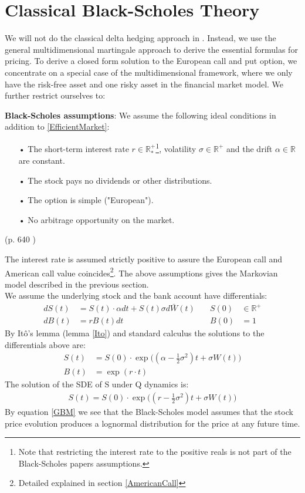 \section{Classical Black-Scholes Theory}\label{classicBS}
We will not do the classical delta hedging approach in \parencite{B-S-Paper}. Instead, we use the general multidimensional martingale approach to derive the essential formulas for pricing. 
To derive a closed form solution to the European call and put option, we concentrate on a special case of the multidimensional framework, where we only have the risk-free asset and one risky asset in the financial market model. 
We further restrict ourselves to:
\theoremstyle{assumption}
\begin{assumption}{\textbf{Black-Scholes assumptions}:}\label{BS-Assumption}
We assume the following ideal conditions in addition to \eqref{EfficientMarket}:
\begin{enumerate}
\item[•] The short-term interest rate $r\in \mathbb{R}^+_*$\footnote{Note that restricting the interest rate to the positive reals is not part of the Black-Scholes papers assumptions.}, volatility $\sigma \in \mathbb{R}^+$ and the drift $\alpha\in \mathbb{R}$ are constant.
\item[•] The stock pays no dividends or other distributions.
\item[•] The option is simple ("European").
\item[•] No arbitrage opportunity on the market.
\end{enumerate}
\null \hfill (p. 640 \parencite{B-S-Paper})
\end{assumption}
The interest rate is assumed strictly positive to assure the European call and American call value coincides\footnote{Detailed explained in section \ref{AmericanCall}}. The above assumptions gives the Markovian model described in the previous section. \\

We assume the underlying stock and the bank account have differentials:
\begin{align*}
dS(t)&=S(t)\cdot \alpha dt+S(t) \sigma d\bar{W}(t) \quad & S(0) &\in \mathbb{R}^+ \\
dB(t)&=r B(t)dt \quad & B(0) &= 1
\end{align*}
By Itô's lemma (lemma \ref{Ito}) and standard calculus the solutions to the differentials above are:
\begin{align*}
S(t)&=S(0) \cdot \exp \bigg( (\alpha -\frac{1}{2} \sigma^2) t + \sigma W(t) \bigg) \\
B(t)&=\exp(r\cdot t)
\end{align*}
The solution of the SDE of S under Q dynamics is:
\begin{equation}\label{GBM}
\begin{split}
S(t)=S(0) \cdot \exp \bigg( (r -\frac{1}{2} \sigma^2) t + \sigma W(t) \bigg)
\end{split}
\end{equation}
By equation \eqref{GBM} we see that the Black-Scholes model assumes that the stock price evolution produces a lognormal distribution for the price at any future time. \\

